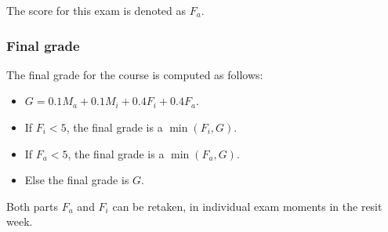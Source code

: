 The score for this exam is denoted as $F_a$.

\subsubsection*{Final grade}
\label{ssub:final_grade}

The final grade for the course is computed as follows:
\begin{itemize}
	\item $G = 0.1M_a + 0.1M_i + 0.4F_i + 0.4F_a$.
	\item If $F_i < 5$, the final grade is a $\min(F_i, G)$.
	\item If $F_a < 5$, the final grade is a $\min(F_a, G)$.
	\item Else the final grade is $G$.
\end{itemize}

Both parts $F_a$ and $F_i$ can be retaken, in individual exam moments in the resit week.


